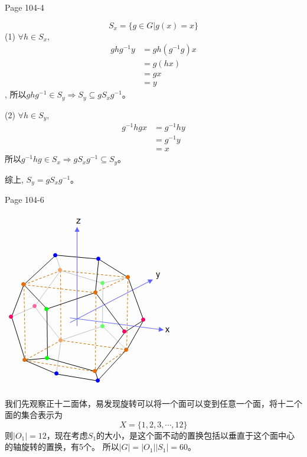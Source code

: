 \documentclass{ximera}
\begin{document}
\begin{problem} Page 104-4
    \begin{solution}
        $$
            S_x = \{ g \in G| g(x) = x \}
        $$
        (1) $\forall h \in S_x$, 
        $$
        \begin{aligned}
            ghg^{-1}y &= gh(g^{-1}g)x \\
            &=g(hx) \\
            &=gx \\
            &=y
        \end{aligned}
        $$,
        所以$ghg^{-1} \in S_y  \Rightarrow S_y \subseteq gS_x g^{-1}$。

        (2) $\forall h \in S_y$, 
        $$
        \begin{aligned}
            g^{-1}hgx &= g^{-1}hy \\
            &= g^{-1}y \\
            &= x
        \end{aligned}
        $$
        所以$g^{-1}hg \in S_x \Rightarrow gS_x g^{-1} \subseteq S_y$。

        综上, $S_y=gS_x g^{-1}$。
    \end{solution}
\end{problem}

\newpage
\begin{problem} Page 104-6

    \includegraphics{Dodecahedron_vertices.png}
    \begin{solution} 我们先观察正十二面体，易发现旋转可以将一个面可以变到任意一个面，将十二个面的集合表示为
        $$
        X = \{1,2,3,\cdots ,12\}
        $$
        则$|O_1| = 12$，现在考虑$S_1$的大小，是这个面不动的置换包括以垂直于这个面中心的轴旋转的置换，有5个。
        所以$|G|=|O_1||S_1| = 60$。
    \end{solution}
\end{problem}
\end{document}
